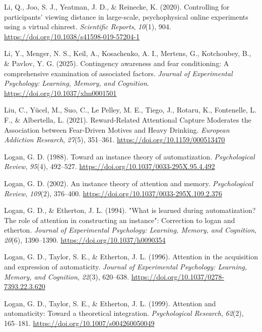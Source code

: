 \documentclass[
  man,
  floatsintext,
  longtable,
  nolmodern,
  notxfonts,
  notimes,
  mask,
  colorlinks=true,linkcolor=blue,citecolor=blue,urlcolor=blue]{apa7}
\newlength{\cslhangindent}
\newenvironment{CSLReferences}[2] %
 {\begin{list}{}{%
  \setlength{\itemindent}{0pt}
  \setlength{\leftmargin}{0pt}
  \setlength{\parsep}{0pt}
  \ifodd #1
   \setlength{\leftmargin}{\cslhangindent}
   \setlength{\itemindent}{-1\cslhangindent}
  \fi
  \setlength{\itemsep}{#2\baselineskip}}}
 {\end{list}}
\begin{document}
\begin{CSLReferences}{1}{0}
Li, Q., Joo, S. J., Yeatman, J. D., \& Reinecke, K. (2020). Controlling
for participants{'} viewing distance in large-scale, psychophysical
online experiments using a virtual chinrest. \emph{Scientific Reports},
\emph{10}(1), 904. \url{https://doi.org/10.1038/s41598-019-57204-1}

Li, Y., Menger, N. S., Keil, A., Kosachenko, A. I., Mertens, G.,
Kotchoubey, B., \& Pavlov, Y. G. (2025). Contingency awareness and fear
conditioning: {A} comprehensive examination of associated factors.
\emph{Journal of Experimental Psychology: Learning, Memory, and
Cognition}. \url{https://doi.org/10.1037/xlm0001501}

Liu, C., Yücel, M., Suo, C., Le Pelley, M. E., Tiego, J., Rotaru, K.,
Fontenelle, L. F., \& Albertella, L. (2021). Reward-Related Attentional
Capture Moderates the Association between Fear-Driven Motives and Heavy
Drinking. \emph{European Addiction Research}, \emph{27}(5), 351--361.
\url{https://doi.org/10.1159/000513470}

Logan, G. D. (1988). Toward an instance theory of automatization.
\emph{Psychological Review}, \emph{95}(4), 492--527.
\url{https://doi.org/10.1037/0033-295X.95.4.492}

Logan, G. D. (2002). An instance theory of attention and memory.
\emph{Psychological Review}, \emph{109}(2), 376--400.
\url{https://doi.org/10.1037/0033-295X.109.2.376}

Logan, G. D., \& Etherton, J. L. (1994). {"}What is learned during
automatization? The role of attention in constructing an instance{"}:
Correction to logan and etherton. \emph{Journal of Experimental
Psychology: Learning, Memory, and Cognition}, \emph{20}(6), 1390--1390.
\url{https://doi.org/10.1037/h0090354}

Logan, G. D., Taylor, S. E., \& Etherton, J. L. (1996). Attention in the
acquisition and expression of automaticity. \emph{Journal of
Experimental Psychology: Learning, Memory, and Cognition}, \emph{22}(3),
620--638. \url{https://doi.org/10.1037/0278-7393.22.3.620}

Logan, G. D., Taylor, S. E., \& Etherton, J. L. (1999). Attention and
automaticity: Toward a theoretical integration. \emph{Psychological
Research}, \emph{62}(2), 165--181.
\url{https://doi.org/10.1007/s004260050049}


\end{CSLReferences}
\end{document}
